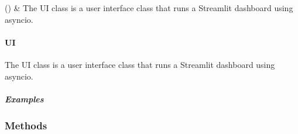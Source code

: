 \documentclass[letterpaper,10pt,english,openany,oneside]{sphinxmanual}
\begin{document}
{{{{\begin{savenotes}\sphinxattablestart
\sphinxthistablewithglobalstyle
\sphinxthistablewithnovlinesstyle
\centering
\begin{tabulary}{\linewidth}[t]{}
\sphinxtoprule
\sphinxtableatstartofbodyhook
\sphinxAtStartPar
{\hyperref[\detokenize{api_reference/generated/QuadratiK.ui.UI:QuadratiK.ui.UI}]{}}()
&
\sphinxAtStartPar
The UI class is a user interface class that runs a Streamlit dashboard using asyncio.
\\
\sphinxbottomrule
\end{tabulary}
\sphinxtableafterendhook\par
\sphinxattableend\end{savenotes}

\sphinxstepscope


\paragraph{UI}
\label{\detokenize{api_reference/generated/QuadratiK.ui.UI:ui}}\label{\detokenize{api_reference/generated/QuadratiK.ui.UI::doc}}

\begin{fulllineitems}
\label{\detokenize{api_reference/generated/QuadratiK.ui.UI:QuadratiK.ui.UI}}
\pysigstartsignatures
{}
\pysigstopsignatures
\sphinxAtStartPar
The UI class is a user interface class that runs a Streamlit dashboard using asyncio.


\subparagraph{Examples}
\label{\detokenize{api_reference/generated/QuadratiK.ui.UI:examples}}
\begin{sphinxVerbatim}[commandchars=\\\{\}]
   
\end{sphinxVerbatim}

\end{fulllineitems}

\subsubsection*{Methods}


}}}}
\end{document}
